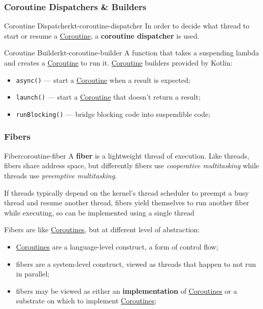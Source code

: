 \subsubsection{Coroutine Dispatchers \& Builders}\label{sub:rs_coroutine_dispatchers_builders} %
\begin{definition}{Coroutine Dispatcher}{kt-coroutine-dispatcher}
    In order to decide what thread to start or resume a \hyperref[sub:rs_co_routines]{Coroutine}, a \textbf{coroutine dispatcher} is used.
\end{definition}
\begin{definition}{Coroutine Builder}{kt-coroutine-builder}
    A function that takes a suspending lambda and creates a \hyperref[sub:rs_co_routines]{Coroutine} to run it.
    \hyperref[sub:rs_co_routines]{Coroutine} builders provided by Kotlin:
    \begin{itemize}
        \item \texttt{async()} --- start a \hyperref[sub:rs_co_routines]{Coroutine} when a result is expected;
        \item \texttt{launch()} --- start a \hyperref[sub:rs_co_routines]{Coroutine} that doesn't return a result;
        \item \texttt{runBlocking()} --- bridge blocking code into suspendible code;
    \end{itemize}
\end{definition}
%
\subsubsection{Fibers}\label{sub:rs_fibers} %
\begin{definition}{Fiber}{coroutine-fiber}
    A \textbf{fiber} is a lightweight thread of execution.
    Like threads, fibers share address space, but differently fibers use \textit{cooperative multitasking} while threads use \textit{preemptive multitasking}.
    \begin{note}
        If threads typically depend on the kernel's thread scheduler to preempt a busy thread and resume another thread, fibers yield themselves to run another fiber while executing, so can be implemented using a single thread
    \end{note}
\end{definition}
Fibers are like \hyperref[sub:rs_co_routines]{Coroutines}, but at different level of abstraction:
\begin{itemize}
    \item \hyperref[sub:rs_co_routines]{Coroutines} are a language-level construct, a form of control flow;
    \item fibers are a system-level construct, viewed as threads that happen to not run in parallel;
    \item fibers may be viewed as either an \textbf{implementation} of \hyperref[sub:rs_co_routines]{Coroutines} or a substrate on which to implement \hyperref[sub:rs_co_routines]{Coroutines};
\end{itemize}
%
